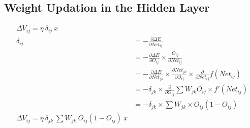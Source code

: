 \documentclass[12pt, right open]{memoir}
\begin{document}
\subsection{Weight  Updation in the Hidden Layer}
\begin{align*}
\Delta V_{ij} = \eta~\delta_{ij}~x \\
\delta_{ij} &= - \frac{\partial \Delta E}{\partial Net_{ij}} \\
       &= - \frac{\partial \Delta E}{\partial O_{ij}} \times \frac{O_{ij}}{\partial Net_{ij}} \\
       &= - \frac{\partial \Delta E}{\partial Net_{jk}} \times \frac{\partial Net_{jk}}{\partial O_{ij}} \times \frac{\partial}{\partial Net_{ij}} f(Net_{ij}) \\
       &= - \delta_{jk} \times \frac{\partial}{\partial O_{ij}} \sum W_{jk} O_{ij} \times f'(Net_{ij}) \\
       &= - \delta_{jk} \times \sum W_{jk} \times O_{ij}(1-O_{ij}) \\
\Delta V_{ij} = \eta~\delta_{jk} ~ \sum W_{jk} ~ O_{ij}(1-O_{ij})~x
\end{align*}
\end{document}

